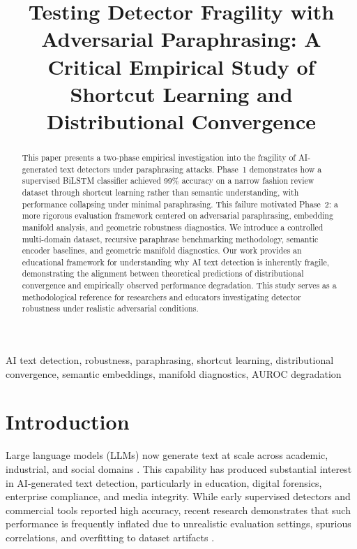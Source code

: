 \documentclass[conference]{IEEEtran}
\begin{document}
\title{Testing Detector Fragility with Adversarial Paraphrasing: A Critical Empirical Study of Shortcut Learning and Distributional Convergence}

\author{
}

\maketitle

\begin{abstract}
This paper presents a two-phase empirical investigation into the fragility of AI-generated text detectors under paraphrasing attacks. Phase~1 demonstrates how a supervised BiLSTM classifier achieved 99\% accuracy on a narrow fashion review dataset through shortcut learning rather than semantic understanding, with performance collapsing under minimal paraphrasing. This failure motivated Phase~2: a more rigorous evaluation framework centered on adversarial paraphrasing, embedding manifold analysis, and geometric robustness diagnostics. We introduce a controlled multi-domain dataset, recursive paraphrase benchmarking methodology, semantic encoder baselines, and geometric manifold diagnostics. Our work provides an educational framework for understanding why AI text detection is inherently fragile, demonstrating the alignment between theoretical predictions of distributional convergence and empirically observed performance degradation. This study serves as a methodological reference for researchers and educators investigating detector robustness under realistic adversarial conditions.
\end{abstract}

\begin{IEEEkeywords}
AI text detection, robustness, paraphrasing, shortcut learning, distributional convergence, semantic embeddings, manifold diagnostics, AUROC degradation
\end{IEEEkeywords}

\section{Introduction}

Large language models (LLMs) now generate text at scale across academic, industrial, and social domains \cite{brown2020language}. This capability has produced substantial interest in AI-generated text detection, particularly in education, digital forensics, enterprise compliance, and media integrity. While early supervised detectors and commercial tools reported high accuracy, recent research demonstrates that such performance is frequently inflated due to unrealistic evaluation settings, spurious correlations, and overfitting to dataset artifacts \cite{sadasivan2023can,krishna2023paraphrasing}.
\end{document}
